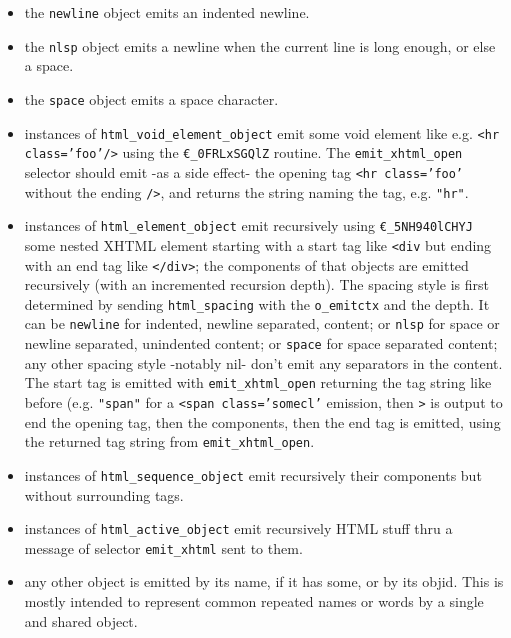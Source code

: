   \begin{itemize}
    
\item the \texttt{newline} object emits an indented newline.
  
\item the \texttt{nlsp} object emits a newline when the current line
  is long enough, or else a space.
  
\item the \texttt{space} object emits a space character.
  
\item instances of \texttt{html\_void\_element\_object} emit some void
  element like e.g. \texttt{<hr class='foo'/>} using the
  \texttt{€\_0FRLxSGQlZ} routine. The \texttt{emit\_xhtml\_open}
  selector should emit -as a side effect- the opening tag \texttt{<hr
    class='foo'} without the ending \texttt{/>}, and returns the string naming the tag, e.g. \texttt{"hr"}.
  
\item instances of \texttt{html\_element\_object} emit recursively
  using \texttt{€\_5NH940lCHYJ} some nested XHTML element starting
  with a start tag like \texttt{<div} but ending with an end tag like
  \texttt{</div>}; the components of that objects are emitted
  recursively (with an incremented recursion depth). The spacing style
  is first determined by sending \texttt{html\_spacing} with the
  \texttt{o\_emitctx} and the depth. It can be \texttt{newline} for
  indented, newline separated, content; or \texttt{nlsp} for space or
  newline separated, unindented content; or \texttt{space} for space
  separated content; any other spacing style -notably nil- don't emit
  any separators in the content. The start tag is emitted with
  \texttt{emit\_xhtml\_open} returning the tag string like before
  (e.g. \texttt{"span"} for a \texttt{<span class='somecl'} emission,
  then \texttt{>} is output to end the opening tag, then the
  components, then the end tag is emitted, using the returned tag
  string from \texttt{emit\_xhtml\_open}.
  
\item instances of \texttt{html\_sequence\_object} emit
      recursively their components but without surrounding tags.
      
\item instances of \texttt{html\_active\_object} emit recursively HTML
      stuff thru a message of selector \texttt{emit\_xhtml} sent to them.
      
\item any other object is emitted by its name, if it has some, or by
  its objid. This is mostly intended to represent common repeated names or
  words by a single and shared object.
\end{itemize}

